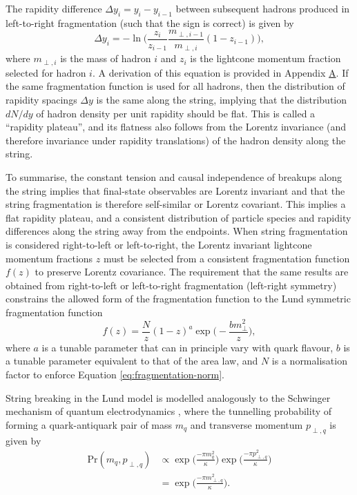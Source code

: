\documentclass[12pt,a4paper]{report}
\begin{document}
The rapidity difference $\Delta y_i = y_i - y_{i - 1}$ between subsequent hadrons produced in left-to-right fragmentation (such that the sign is correct) is given by
\begin{equation}\label{eq:rapidity-spacing}
  \Delta y_i = -\ln \Bigr( \frac{z_i}{z_{i-1}} \frac{m_{\perp,i-1}}{m_{\perp,i}} (1 - z_{i-1})  \Bigr),
\end{equation}
where $m_{\perp,i}$ is the mass of hadron $i$ and $z_i$ is the lightcone momentum fraction selected for hadron $i$. A derivation of this equation is provided in Appendix \hyperref[app:rapidity-spacing]{A}. If the same fragmentation function is used for all hadrons, then the distribution of rapidity spacings $\Delta y$ is the same along the string, implying that the distribution $dN/dy$ of hadron density per unit rapidity should be flat. This is called a ``rapidity plateau'', and its flatness also follows from the Lorentz invariance (and therefore invariance under rapidity translations) of the hadron density along the string.

To summarise, the constant tension and causal independence of breakups along the string implies that final-state observables are Lorentz invariant and that the string fragmentation is therefore self-similar or Lorentz covariant. This implies a flat rapidity plateau, and a consistent distribution of particle species and rapidity differences along the string away from the endpoints. When string fragmentation is considered right-to-left or left-to-right, the Lorentz invariant lightcone momentum fractions $z$ must be selected from a consistent fragmentation function $f(z)$ to preserve Lorentz covariance. The requirement that the same results are obtained from right-to-left or left-to-right fragmentation (left-right symmetry) constrains the allowed form of the fragmentation function to the Lund symmetric fragmentation function
\begin{equation}\label{eq:lund-fragmentation-function}
  f(z) = \frac{N}{z} (1-z)^a \exp\Bigr( -\frac{b m_\perp^2}{z}\Bigr),
\end{equation}
where $a$ is a tunable parameter that can in principle vary with quark flavour, $b$ is a tunable parameter equivalent to that of the area law, and $N$ is a normalisation factor to enforce Equation \eqref{eq:fragmentation-norm}.

String breaking in the Lund model is modelled analogously to the Schwinger mechanism of quantum electrodynamics \cite{Schwinger:1962tp}, where the tunnelling probability of forming a quark-antiquark pair of mass $m_q$ and transverse momentum $p_{\perp,q}$ is given by
\begin{align}\label{eq:schwinger-mechanism}
  \text{Pr}(m_q, p_{\perp,q}) &\propto \exp\Bigr(\frac{-\pi m_q^2}{\kappa}\Bigr) \exp\Bigr(\frac{-\pi p_{\perp,q}^2}{\kappa}\Bigr) \nonumber \\
  &= \exp \Bigr(\frac{-\pi m_{\perp,q}^2}{\kappa}\Bigr).
\end{align}
\end{document}
